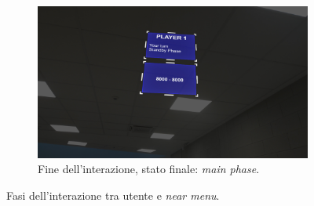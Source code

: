 \begin{figure}
    \begin{subfigure}{0.8\textwidth}
        \centering
        \includegraphics[width=\linewidth]{images/interazione2.jpg}
        \caption{Fine dell'interazione, stato finale: \textit{main phase}.}
        \label{fig:interazione2.jpg}
    \end{subfigure}

    \caption{Fasi dell'interazione tra utente e \textit{near menu}.}
    \label{fig:interazioneFase.jpg}
\end{figure}


